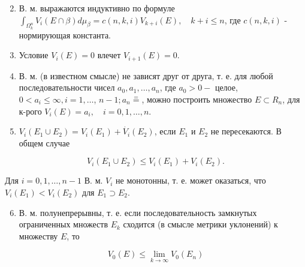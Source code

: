 \documentclass[10pt]{article}
\begin{document}
\begin{enumerate}

  \setcounter{enumi}{1}

  \item В. м. выражаются индуктивно по формуле $\int_{\Omega_{k}^{n}} V_{i}(E \cap \beta) d \mu_{\beta}=c(n, k, i) V_{k+i}(E), \quad k+i \leqslant n$, где $c(n, k, i)$ - нормирующая константа.



  \item Условие $V_{i}(E)=0$ влечет $V_{i+1}(E)=0$.



  \item В. м. (в известном смысле) не зависят друг от друга, т. е. для любой последовательности чисел $a_{0}, a_{1}, \ldots, a_{n}$, где $a_{0}>0-$ целое, $0<a_{i} \leqslant \infty, i=1, \ldots$, $n-1 ; a_{n} \stackrel{=}{=}$, можно построить множество $E \subset R_{n}$, для к-рого $V_{i}(E)=a_{i}, \quad i=0,1, \ldots, n$.



  \item $V_{i}\left(E_{1} \cup E_{2}\right)=V_{i}\left(E_{1}\right)+\dot{V_{i}}\left(E_{2}\right)$, если $E_{1}$ и $E_{2}$ не пересекаются. В общем случае



\end{enumerate}



\[

V_{i}\left(E_{1} \cup E_{2}\right) \leqslant V_{i}\left(E_{1}\right)+V_{i}\left(E_{2}\right) .

\]



Для $i=0,1, \ldots, n-1$ В. м. $V_{i}$ не монотонны, т. е. может оказаться, что $V_{i}\left(E_{1}\right)<V_{i}\left(E_{2}\right)$ для $E_{1} \supset E_{2}$.



\begin{enumerate}

  \setcounter{enumi}{5}

  \item В. м. полунепрерывны, т. е. если последовательность замкнутых ограниченных множеств $E_{k}$ сходится (в смысле метрики уклонений) к множеству $E$, то

\end{enumerate}



\[

V_{0}(E) \leqslant \lim _{k \rightarrow \infty} V_{0}\left(E_{n}\right)

\]
\end{document}
